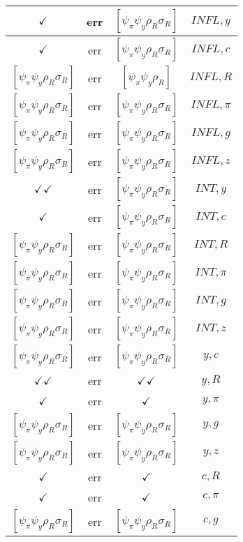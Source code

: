\documentclass[a4paper,10pt]{article}
\begin{document}
\begin{longtable}{|c|c|c|c|}
\hline
$\checkmark$ & err & $[\psi_\pi \psi_y \rho_R \sigma_R ]$ & ${INFL},{y}$ \\
\hline
$\checkmark$ & err & $[\psi_\pi \psi_y \rho_R \sigma_R ]$ & ${INFL},{c}$ \\
\hline
$[\psi_\pi \psi_y \rho_R \sigma_R ]$ & err & $[\psi_\pi \psi_y \rho_R ]$ & ${INFL},{R}$ \\
\hline
$[\psi_\pi \psi_y \rho_R \sigma_R ]$ & err & $[\psi_\pi \psi_y \rho_R \sigma_R ]$ & ${INFL},{\pi}$ \\
\hline
$[\psi_\pi \psi_y \rho_R \sigma_R ]$ & err & $[\psi_\pi \psi_y \rho_R \sigma_R ]$ & ${INFL},{g}$ \\
\hline
$[\psi_\pi \psi_y \rho_R \sigma_R ]$ & err & $[\psi_\pi \psi_y \rho_R \sigma_R ]$ & ${INFL},{z}$ \\
\hline
$\checkmark\checkmark$ & err & $[\psi_\pi \psi_y \rho_R \sigma_R ]$ & ${INT},{y}$ \\
\hline
$\checkmark$ & err & $[\psi_\pi \psi_y \rho_R \sigma_R ]$ & ${INT},{c}$ \\
\hline
$[\psi_\pi \psi_y \rho_R \sigma_R ]$ & err & $[\psi_\pi \psi_y \rho_R \sigma_R ]$ & ${INT},{R}$ \\
\hline
$[\psi_\pi \psi_y \rho_R \sigma_R ]$ & err & $[\psi_\pi \psi_y \rho_R \sigma_R ]$ & ${INT},{\pi}$ \\
\hline
$[\psi_\pi \psi_y \rho_R \sigma_R ]$ & err & $[\psi_\pi \psi_y \rho_R \sigma_R ]$ & ${INT},{g}$ \\
\hline
$[\psi_\pi \psi_y \rho_R \sigma_R ]$ & err & $[\psi_\pi \psi_y \rho_R \sigma_R ]$ & ${INT},{z}$ \\
\hline
$[\psi_\pi \psi_y \rho_R \sigma_R ]$ & err & $[\psi_\pi \psi_y \rho_R \sigma_R ]$ & ${y},{c}$ \\
\hline
$\checkmark\checkmark$ & err & $\checkmark\checkmark$ & ${y},{R}$ \\
\hline
$\checkmark$ & err & $\checkmark$ & ${y},{\pi}$ \\
\hline
$[\psi_\pi \psi_y \rho_R \sigma_R ]$ & err & $[\psi_\pi \psi_y \rho_R \sigma_R ]$ & ${y},{g}$ \\
\hline
$[\psi_\pi \psi_y \rho_R \sigma_R ]$ & err & $[\psi_\pi \psi_y \rho_R \sigma_R ]$ & ${y},{z}$ \\
\hline
$\checkmark$ & err & $\checkmark$ & ${c},{R}$ \\
\hline
$\checkmark$ & err & $\checkmark$ & ${c},{\pi}$ \\
\hline
$[\psi_\pi \psi_y \rho_R \sigma_R ]$ & err & $[\psi_\pi \psi_y \rho_R \sigma_R ]$ & ${c},{g}$ \\

\end{longtable}
\end{document}
